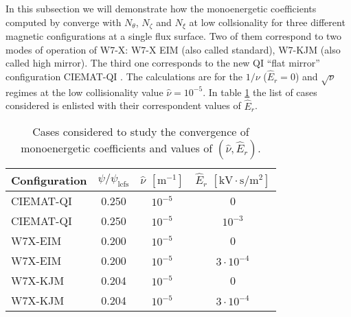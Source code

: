 In this subsection we will demonstrate how the monoenergetic coefficients computed by {\MONKES} converge with $N_\theta$, $N_\zeta$ and $N_\xi$ at low collsionality for three different magnetic configurations at a single flux surface. Two of them correspond to two modes of operation of W7-X: W7-X EIM (also called standard), W7-KJM (also called high mirror). The third one corresponds to the new QI ``flat mirror'' configuration CIEMAT-QI \cite{Sanchez_2023}. The calculations are for the $1/\nu$ ($\hat{E}_r=0$) and $\sqrt{\nu}$ regimes at the low collisionality value $\hat{\nu}=10^{-5}$. In table \ref{tab:Convergence_cases} the list of cases considered is enlisted with their correspondent values of $\hat{E}_r$.
\begin{table}[]
	\centering
	\begin{tabular}{@{}lccc@{}}
		\toprule
		Configuration & $\psi/\psi_{\text{lcfs}}$ & $\hat{\nu}$ $[\text{m}^{-1}]$ & $\hat{E}_r$  $[\text{kV}\cdot\text{s}/\text{m}^2]$   \\ \midrule
		CIEMAT-QI     & 0.250                     & $10^{-5}$   & 0       \\
		CIEMAT-QI     & 0.250                     & $10^{-5}$   & $10^{-3}$       \\
		W7X-EIM       & 0.200                     & $10^{-5}$   & 0 \\
		W7X-EIM       & 0.200                     & $10^{-5}$   & $3\cdot10^{-4}$ \\
		W7X-KJM       & 0.204                     & $10^{-5}$   & 0 \\
		W7X-KJM       & 0.204                     & $10^{-5}$   & $3\cdot10^{-4}$ \\ \bottomrule
	\end{tabular}
	\caption{Cases considered to study the convergence of monoenergetic coefficients and values of $(\hat{\nu},\hat{E}_r)$.}
	\label{tab:Convergence_cases}
\end{table}
 
